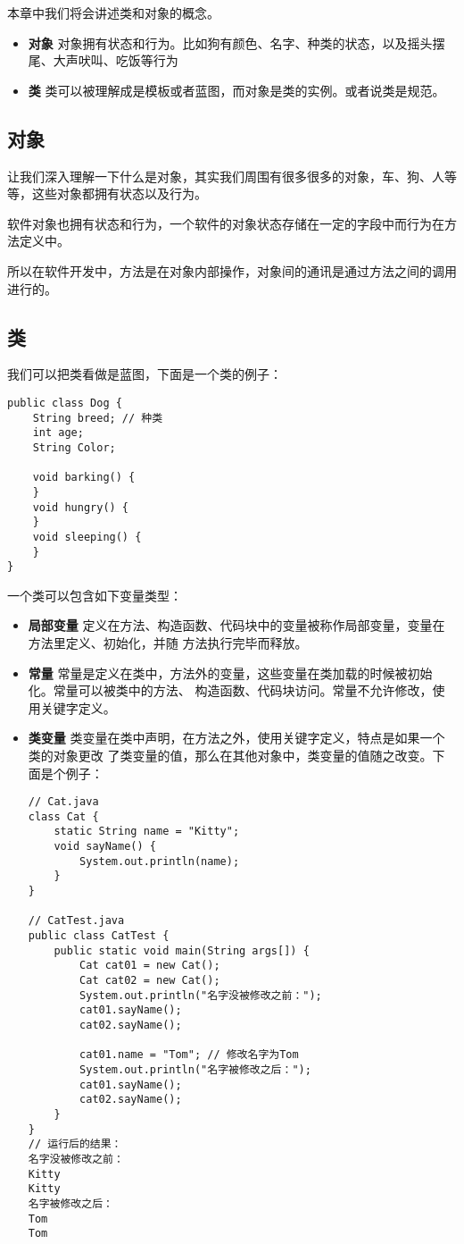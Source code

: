 \documentclass{article}
\begin{document}
本章中我们将会讲述类和对象的概念。
\begin{itemize}
\item {\bf 对象} 对象拥有状态和行为。比如狗有颜色、名字、种类的状态，以及摇头摆尾、大声吠叫、吃饭等行为
\item {\bf 类} 类可以被理解成是模板或者蓝图，而对象是类的实例。或者说类是规范。
\end{itemize}

\subsection{对象}
让我们深入理解一下什么是对象，其实我们周围有很多很多的对象，车、狗、人等等，这些对象都拥有状态以及行为。

软件对象也拥有状态和行为，一个软件的对象状态存储在一定的字段中而行为在方法定义中。

所以在软件开发中，方法是在对象内部操作，对象间的通讯是通过方法之间的调用进行的。

\subsection{类}
我们可以把类看做是蓝图，下面是一个类的例子：

\begin{verbatim}
public class Dog {
	String breed; // 种类
	int age;
	String Color; 
	
	void barking() {
	}
	void hungry() {
	}
	void sleeping() {
	}
}
\end{verbatim}

一个类可以包含如下变量类型：

\begin{itemize}
\item {\bf 局部变量} 定义在方法、构造函数、代码块中的变量被称作局部变量，变量在方法里定义、初始化，并随
方法执行完毕而释放。
\item {\bf 常量} 常量是定义在类中，方法外的变量，这些变量在类加载的时候被初始化。常量可以被类中的方法、
构造函数、代码块访问。常量不允许修改，使用关键字定义。
\item {\bf 类变量} 类变量在类中声明，在方法之外，使用关键字定义，特点是如果一个类的对象更改
了类变量的值，那么在其他对象中，类变量的值随之改变。下面是个例子：

\begin{verbatim}
// Cat.java
class Cat {
	static String name = "Kitty";
	void sayName() {
		System.out.println(name);
	}
}

// CatTest.java
public class CatTest {
	public static void main(String args[]) {
		Cat cat01 = new Cat();
		Cat cat02 = new Cat();
		System.out.println("名字没被修改之前：");
		cat01.sayName();
		cat02.sayName();

		cat01.name = "Tom"; // 修改名字为Tom
		System.out.println("名字被修改之后：");
		cat01.sayName();
		cat02.sayName();
	}
}
// 运行后的结果：
名字没被修改之前：
Kitty
Kitty
名字被修改之后：
Tom
Tom
\end{verbatim}
\end{itemize}
\end{document}
